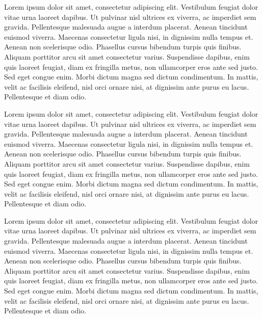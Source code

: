 \documentclass{article}
\begin{document}
\begin{pairs}


\begin{Leftside}
\resumenumbering
\pstart

Lorem ipsum dolor sit amet, consectetur adipiscing elit. Vestibulum feugiat dolor vitae urna laoreet dapibus. Ut pulvinar nisl ultrices ex viverra, ac imperdiet sem gravida. Pellentesque malesuada augue a interdum placerat. Aenean tincidunt euismod viverra. Maecenas consectetur ligula nisi, in dignissim nulla tempus et. Aenean non scelerisque odio. Phasellus cursus bibendum turpis quis finibus. Aliquam porttitor arcu sit amet consectetur varius. Suspendisse dapibus, enim quis laoreet feugiat, diam ex fringilla metus, non ullamcorper eros ante sed justo. Sed eget congue enim. Morbi dictum magna sed dictum condimentum. In mattis, velit ac facilisis eleifend, nisl orci ornare nisi, at dignissim ante purus eu lacus. Pellentesque et diam odio.
\pend
\pausenumbering
\end{Leftside}

\begin{Rightside}
\resumenumbering
\pstart
Lorem ipsum dolor sit amet, consectetur adipiscing elit. Vestibulum feugiat dolor vitae urna laoreet dapibus. Ut pulvinar nisl ultrices ex viverra, ac imperdiet sem gravida. Pellentesque malesuada augue a interdum placerat. Aenean tincidunt euismod viverra. Maecenas consectetur ligula nisi, in dignissim nulla tempus et. Aenean non scelerisque odio. Phasellus cursus bibendum turpis quis finibus. Aliquam porttitor arcu sit amet consectetur varius. Suspendisse dapibus, enim quis laoreet feugiat, diam ex fringilla metus, non ullamcorper eros ante sed justo. Sed eget congue enim. Morbi dictum magna sed dictum condimentum. In mattis, velit ac facilisis eleifend, nisl orci ornare nisi, at dignissim ante purus eu lacus. Pellentesque et diam odio.
\pend
\endnumbering
\end{Rightside}
\end{pairs}

\Columns
\resumenumbering
\pstart
Lorem ipsum dolor sit amet, consectetur adipiscing elit. Vestibulum feugiat dolor vitae urna laoreet dapibus. Ut pulvinar nisl ultrices ex viverra, ac imperdiet sem gravida. Pellentesque malesuada augue a interdum placerat. Aenean tincidunt euismod viverra. Maecenas consectetur ligula nisi, in dignissim nulla tempus et. Aenean non scelerisque odio. Phasellus cursus bibendum turpis quis finibus. Aliquam porttitor arcu sit amet consectetur varius. Suspendisse dapibus, enim quis laoreet feugiat, diam ex fringilla metus, non ullamcorper eros ante sed justo. Sed eget congue enim. Morbi dictum magna sed dictum condimentum. In mattis, velit ac facilisis eleifend, nisl orci ornare nisi, at dignissim ante purus eu lacus. Pellentesque et diam odio.
\pend
\endnumbering
\end{document}
